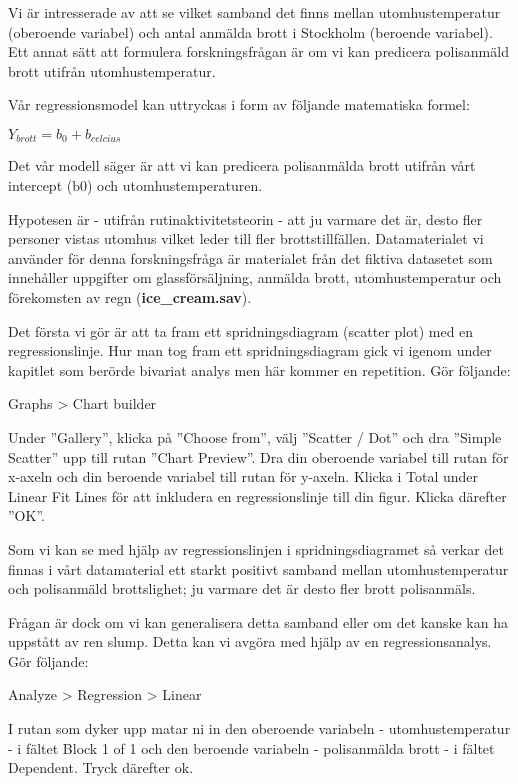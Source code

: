 \documentclass[
]{book}
\begin{document}
Vi är intresserade av att se vilket samband det finns mellan utomhustemperatur (oberoende variabel) och antal anmälda brott i Stockholm (beroende variabel). Ett annat sätt att formulera forskningsfrågan är om vi kan predicera polisanmäld brott utifrån utomhustemperatur.

Vår regressionsmodel kan uttryckas i form av följande matematiska formel:

\(Y_{brott} = b_0 + b_{celcius}\)

Det vår modell säger är att vi kan predicera polisanmälda brott utifrån vårt intercept (b0) och utomhustemperaturen.

Hypotesen är - utifrån rutinaktivitetsteorin - att ju varmare det är, desto fler personer vistas utomhus vilket leder till fler brottstillfällen. Datamaterialet vi använder för denna forskningsfråga är materialet från det fiktiva datasetet som innehåller uppgifter om glassförsäljning, anmälda brott, utomhustemperatur och förekomsten av regn (\textbf{ice\_cream.sav}).

Det första vi gör är att ta fram ett spridningsdiagram (scatter plot) med en regressionslinje. Hur man tog fram ett spridningsdiagram gick vi igenom under kapitlet som berörde bivariat analys men här kommer en repetition. Gör följande:

Graphs \textgreater{} Chart builder

Under ''Gallery'', klicka på ''Choose from'', välj ''Scatter / Dot'' och dra ''Simple Scatter'' upp till rutan ''Chart Preview''. Dra din oberoende variabel till rutan för x-axeln och din beroende variabel till rutan för y-axeln. Klicka i Total under Linear Fit Lines för att inkludera en regressionslinje till din figur. Klicka därefter ''OK''.

Som vi kan se med hjälp av regressionslinjen i spridningsdiagramet så verkar det finnas i vårt datamaterial ett starkt positivt samband mellan utomhustemperatur och polisanmäld brottslighet; ju varmare det är desto fler brott polisanmäls.

Frågan är dock om vi kan generalisera detta samband eller om det kanske kan ha uppstått av ren slump. Detta kan vi avgöra med hjälp av en regressionsanalys. Gör följande:

Analyze \textgreater{} Regression \textgreater{} Linear

I rutan som dyker upp matar ni in den oberoende variabeln - utomhustemperatur - i fältet Block 1 of 1
och den beroende variabeln - polisanmälda brott - i fältet Dependent. Tryck därefter ok.
\end{document}
